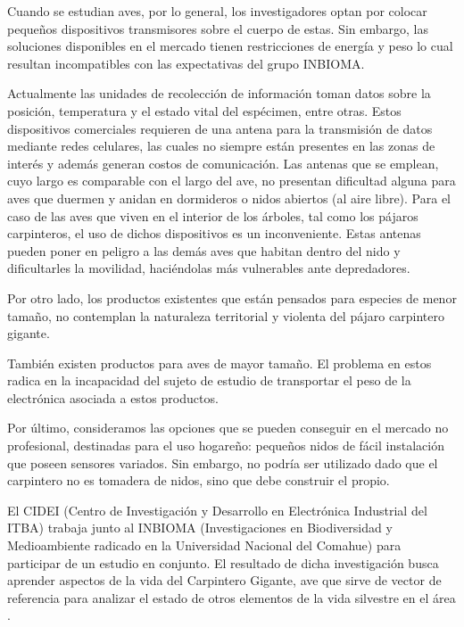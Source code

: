 %

%


Cuando se estudian aves, por lo general, los investigadores optan por colocar pequeños dispositivos transmisores sobre el cuerpo de estas. Sin embargo, las soluciones disponibles en el mercado tienen restricciones de energía y peso lo cual resultan incompatibles con las expectativas del grupo INBIOMA.

Actualmente las unidades de recolección de información toman datos sobre la posición, temperatura y el estado vital del espécimen, entre otras. Estos dispositivos comerciales requieren de una antena para la transmisión de datos mediante redes celulares, las cuales no siempre están presentes en las zonas de interés y además generan costos de comunicación. Las antenas que se emplean, cuyo largo es comparable con el largo del ave, no presentan dificultad alguna para aves que duermen y anidan en dormideros o nidos abiertos (al aire libre). Para el caso de las aves que viven en el interior de los árboles, tal como los pájaros carpinteros, el uso de dichos dispositivos es un inconveniente. Estas antenas pueden poner en peligro a las demás aves que habitan dentro del nido y dificultarles la movilidad, haciéndolas más vulnerables ante depredadores.

Por otro lado, los productos existentes que están pensados para especies de menor tamaño, no contemplan la naturaleza territorial y violenta del pájaro carpintero gigante.

También existen productos para aves de mayor tamaño. El problema en estos radica en la incapacidad del sujeto de estudio de transportar el peso de la electrónica asociada a estos productos.

Por último, consideramos las opciones que se pueden conseguir en el mercado no profesional, destinadas para el uso hogareño: pequeños nidos de fácil instalación que poseen sensores variados. Sin embargo, no podría ser utilizado dado que el carpintero no es tomadera de nidos, sino que debe construir el propio. 

El CIDEI (Centro de Investigación y Desarrollo en Electrónica Industrial del ITBA) trabaja junto al INBIOMA (Investigaciones en Biodiversidad y Medioambiente radicado en la Universidad Nacional del Comahue) para participar de un estudio en conjunto. El resultado de dicha investigación busca aprender aspectos de la vida del Carpintero Gigante, ave que sirve de vector de referencia para analizar el estado de otros elementos de la vida silvestre en el área \cite{ref:PaperValeriaOjeda}.

